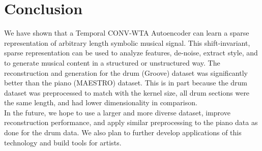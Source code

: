 \documentclass[11pt,a4paper]{article}
\begin{document}
\section{Conclusion}

%
%


We have shown that a Temporal CONV-WTA Autoencoder can learn a sparse representation of arbitrary length symbolic musical signal. This shift-invariant, sparse representation can be used to analyze features, de-noise, extract style, and to generate musical content in a structured or unstructured way. The reconstruction and generation for the drum (Groove) dataset was significantly better than the piano (MAESTRO) dataset. This is in part because the drum dataset was preprocessed to match with the kernel size, all drum sections were the same length, and had lower dimensionality in comparison. \\
In the future, we hope to use a larger and more diverse dataset, improve reconstruction performance, and apply similar preprocessing to the piano data as done for the drum data. We also plan to further develop applications of this technology and build tools for artists.
\\
\\
\\
\\
\\
%
\end{document}

